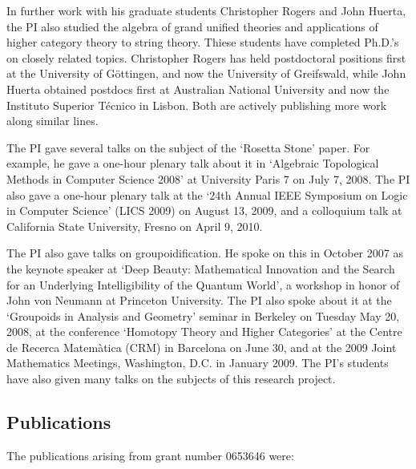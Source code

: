 \documentclass[12pt]{amsart}
\begin{document}
In further work with his graduate students Christopher Rogers and John
Huerta, the PI also studied the algebra of grand unified theories and
applications of higher category theory to string theory.  Thiese
students have completed Ph.D.'s on closely related topics.
Christopher Rogers has held postdoctoral positions first at the
University of G\"ottingen, and now the University of Greifswald, while John Huerta obtained postdocs first at Australian National University and now the Instituto Superior T\'ecnico in Lisbon.  Both are actively publishing more work along similar lines.

The PI gave several talks on the subject of the `Rosetta Stone' paper. For example, he gave a one-hour plenary talk about it in `Algebraic Topological Methods in Computer Science 2008' at University Paris 7 on July 7, 2008. The PI also gave a one-hour plenary talk at the `24th Annual IEEE Symposium on Logic in Computer Science' (LICS 2009) on August 13, 2009, and a colloquium talk at California State University, Fresno on April 9, 2010. 

The PI also gave talks on groupoidification. He spoke on this in
October 2007 as the keynote speaker at `Deep Beauty: Mathematical
Innovation and the Search for an Underlying Intelligibility of the
Quantum World', a workshop in honor of John von Neumann at Princeton
University. The PI also spoke about it at the `Groupoids in Analysis and Geometry' seminar in Berkeley on Tuesday May 20, 2008, at the conference `Homotopy Theory and Higher Categories' at the Centre de Recerca Matem\`atica (CRM) in Barcelona on June 30, and at the 2009 Joint Mathematics Meetings, Washington, D.C. in January 2009.  The PI's students have also given many talks on the subjects of this research project.


\subsection{Publications}

The publications arising from grant number 0653646 were:
\end{document}

